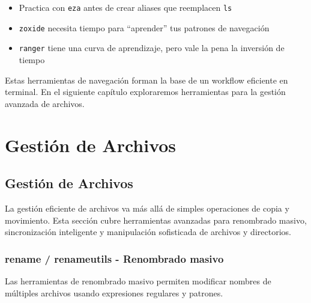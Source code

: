 \documentclass[
  11pt,
  letterpaper,
  oneside,
  openany]{scrbook}
\providecommand{\tightlist}{%
  \setlength{\itemsep}{0pt}\setlength{\parskip}{0pt}}
\begin{document}
\begin{tcolorbox}[enhanced jigsaw, toprule=.15mm, bottomrule=.15mm, opacityback=0, coltitle=black, rightrule=.15mm, colframe=quarto-callout-important-color-frame, titlerule=0mm, opacitybacktitle=0.6, left=2mm, colback=white, bottomtitle=1mm, arc=.35mm, leftrule=.75mm, title=\textcolor{quarto-callout-important-color}{\faExclamation}\hspace{0.5em}{Importante para nuevos usuarios}, colbacktitle=quarto-callout-important-color!10!white, breakable, toptitle=1mm]

\begin{itemize}
\tightlist
\item
  Practica con \texttt{eza} antes de crear aliases que reemplacen
  \texttt{ls}
\item
  \texttt{zoxide} necesita tiempo para ``aprender'' tus patrones de
  navegación
\item
  \texttt{ranger} tiene una curva de aprendizaje, pero vale la pena la
  inversión de tiempo
\end{itemize}

\end{tcolorbox}

Estas herramientas de navegación forman la base de un workflow eficiente
en terminal. En el siguiente capítulo exploraremos herramientas para la
gestión avanzada de archivos.

\part{Gestión de Archivos}

\chapter{Gestión de Archivos}\label{gestiuxf3n-de-archivos-3}

La gestión eficiente de archivos va más allá de simples operaciones de
copia y movimiento. Esta sección cubre herramientas avanzadas para
renombrado masivo, sincronización inteligente y manipulación sofisticada
de archivos y directorios.

\section{rename / renameutils - Renombrado masivo}\label{sec-rename}

Las herramientas de renombrado masivo permiten modificar nombres de
múltiples archivos usando expresiones regulares y patrones.
\end{document}
